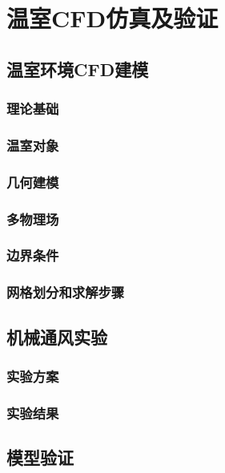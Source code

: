 

\chapter{温室CFD仿真及验证}
\label{chapter:CFD}

\section{温室环境CFD建模}
	\subsection{理论基础}
	\subsection{温室对象}
	\subsection{几何建模}
	\subsection{多物理场}
	\subsection{边界条件}
	\subsection{网格划分和求解步骤}

\section{机械通风实验}
	\subsection{实验方案}
	\subsection{实验结果}
	
\section{模型验证}

